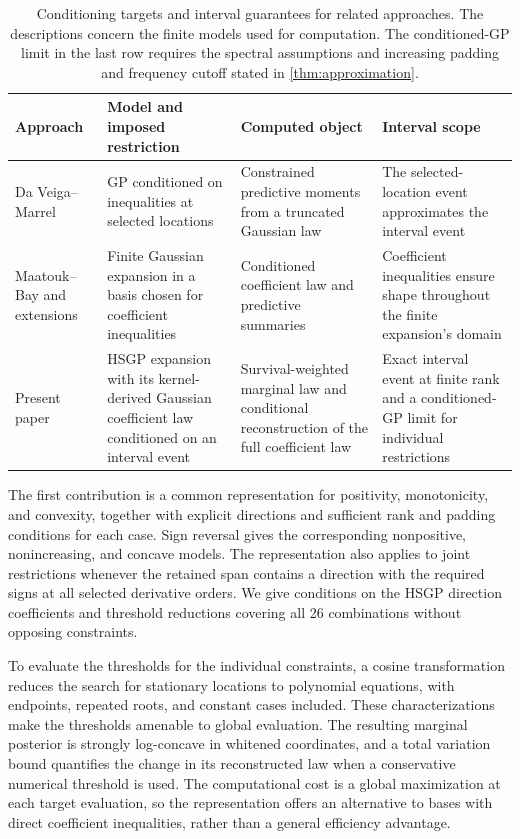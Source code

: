\begin{table}[htbp]
\centering
\small
\setlength{\tabcolsep}{4pt}
\begin{tabular}{@{}
 >{\raggedright\arraybackslash}p{}
 >{\raggedright\arraybackslash}p{}
 >{\raggedright\arraybackslash}p{}
 >{\raggedright\arraybackslash}p{}@{}}
\toprule
Approach & Model and imposed restriction & Computed object & Interval scope\\
\midrule
Da Veiga--Marrel
 & GP conditioned on inequalities at selected locations
 & Constrained predictive moments from a truncated Gaussian law
 & The selected-location event approximates the interval event\\
Maatouk--Bay and extensions
 & Finite Gaussian expansion in a basis chosen for coefficient inequalities
 & Conditioned coefficient law and predictive summaries
 & Coefficient inequalities ensure shape throughout the finite expansion's domain\\
Present paper
 & HSGP expansion with its kernel-derived Gaussian coefficient law conditioned on an interval event
 & Survival-weighted marginal law and conditional reconstruction of the full coefficient law
 & Exact interval event at finite rank and a conditioned-GP limit for individual restrictions\\
\bottomrule
\end{tabular}
\caption{Conditioning targets and interval guarantees for related approaches.
The descriptions concern the finite models used for computation. The
conditioned-GP limit in the last row requires the spectral assumptions
and increasing padding and frequency cutoff stated in
\cref{thm:approximation}.}
\label{tab:literature-position}
\end{table}

The first contribution is a common representation for positivity,
monotonicity, and convexity, together with explicit directions and
sufficient rank and padding conditions for each case. Sign reversal
gives the corresponding nonpositive, nonincreasing, and concave
models. The representation also applies to joint restrictions whenever
the retained span contains a direction with the required signs at all
selected derivative orders. We give conditions on the HSGP direction
coefficients and threshold reductions covering all 26 combinations
without opposing constraints.

To evaluate the thresholds for the individual constraints, a cosine
transformation reduces the search for stationary
locations to polynomial equations, with endpoints, repeated roots,
and constant cases included. These characterizations make the
thresholds amenable to global evaluation. The resulting marginal
posterior is strongly log-concave in whitened coordinates, and a
total variation bound quantifies the change in its reconstructed
law when a conservative numerical threshold is used. The
computational cost is a global maximization at each target evaluation,
so the representation offers an alternative to bases with direct
coefficient inequalities, rather than a general efficiency advantage.

